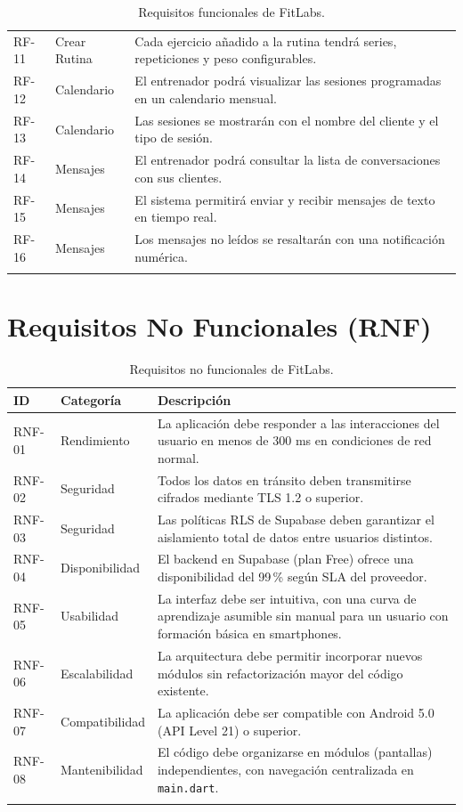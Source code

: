 \begin{longtable}{@{}p{1.5cm}p{4cm}p{8.5cm}@{}}
RF-11 & Crear Rutina & Cada ejercicio añadido a la rutina tendrá series, repeticiones y peso configurables. \\
RF-12 & Calendario & El entrenador podrá visualizar las sesiones programadas en un calendario mensual. \\
RF-13 & Calendario & Las sesiones se mostrarán con el nombre del cliente y el tipo de sesión. \\
RF-14 & Mensajes & El entrenador podrá consultar la lista de conversaciones con sus clientes. \\
RF-15 & Mensajes & El sistema permitirá enviar y recibir mensajes de texto en tiempo real. \\
RF-16 & Mensajes & Los mensajes no leídos se resaltarán con una notificación numérica. \\
\bottomrule
\caption{Requisitos funcionales de FitLabs.}
\label{tab:rf}
\end{longtable}

\section{Requisitos No Funcionales (RNF)}

\begin{longtable}{@{}p{1.5cm}p{3cm}p{9cm}@{}}
\toprule
\textbf{ID} & \textbf{Categoría} & \textbf{Descripción} \\
\midrule
\endhead
RNF-01 & Rendimiento & La aplicación debe responder a las interacciones del usuario en menos de 300 ms en condiciones de red normal. \\
RNF-02 & Seguridad & Todos los datos en tránsito deben transmitirse cifrados mediante TLS 1.2 o superior. \\
RNF-03 & Seguridad & Las políticas RLS de Supabase deben garantizar el aislamiento total de datos entre usuarios distintos. \\
RNF-04 & Disponibilidad & El backend en Supabase (plan Free) ofrece una disponibilidad del 99\,\% según SLA del proveedor. \\
RNF-05 & Usabilidad & La interfaz debe ser intuitiva, con una curva de aprendizaje asumible sin manual para un usuario con formación básica en smartphones. \\
RNF-06 & Escalabilidad & La arquitectura debe permitir incorporar nuevos módulos sin refactorización mayor del código existente. \\
RNF-07 & Compatibilidad & La aplicación debe ser compatible con Android 5.0 (API Level 21) o superior. \\
RNF-08 & Mantenibilidad & El código debe organizarse en módulos (pantallas) independientes, con navegación centralizada en \texttt{main.dart}. \\
\bottomrule
\caption{Requisitos no funcionales de FitLabs.}
\label{tab:rnf}
\end{longtable}

